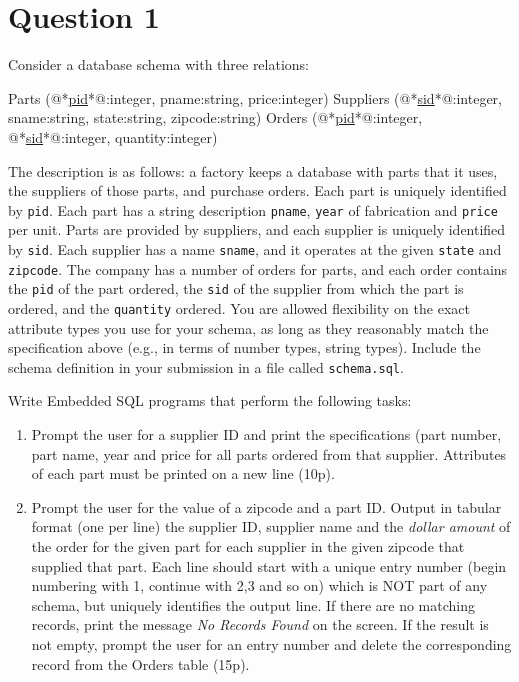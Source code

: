 
\section*{Question 1}

Consider a database schema with three relations:

\begin{terminal}
Parts (@*\underline{pid}*@:integer, pname:string, price:integer)
Suppliers (@*\underline{sid}*@:integer, sname:string, state:string, zipcode:string)
Orders (@*\underline{pid}*@:integer, @*\underline{sid}*@:integer, quantity:integer)
\end{terminal}

The description is as follows: a factory keeps a database with parts that it uses, the suppliers of those parts, and purchase orders.
Each part is uniquely identified by \texttt{pid}.
Each part has a string description \texttt{pname}, \texttt{year} of fabrication and \texttt{price} per unit.
Parts are provided by suppliers, and each supplier is uniquely identified by \texttt{sid}.
Each supplier has a name \texttt{sname}, and it operates at the given \texttt{state} and \texttt{zipcode}.
The company has a number of orders for parts, and each order contains the \texttt{pid} of the part ordered, the \texttt{sid} of the supplier from which the part is ordered, and the \texttt{quantity} ordered.
You are allowed flexibility on the exact attribute types you use for your schema, as long as they reasonably match the specification above (e.g., in terms of number types, string types).
Include the schema definition in your submission in a file called \texttt{schema.sql}.

Write Embedded SQL programs that perform the following tasks:

\begin{enumerate}[label=(\alph*)]
\item Prompt the user for a supplier ID and print the specifications (part number, part name, year and price for all parts ordered from that supplier.
Attributes of each part must be printed on a new line (10p).
\item Prompt the user for the value of a zipcode and a part ID.
Output in tabular format (one per line) the supplier ID, supplier name and the \textit{dollar amount} of the order for the given part for each supplier in the given zipcode that supplied that part.
Each line should start with a unique entry number (begin numbering with 1, continue with 2,3 and so on) which is NOT part of any schema, but uniquely identifies the output line.
If there are no matching records, print the message \textit{No Records Found} on the screen.
If the result is not empty, prompt the user for an entry number and delete the corresponding record from the Orders table (15p).
\end{enumerate}


